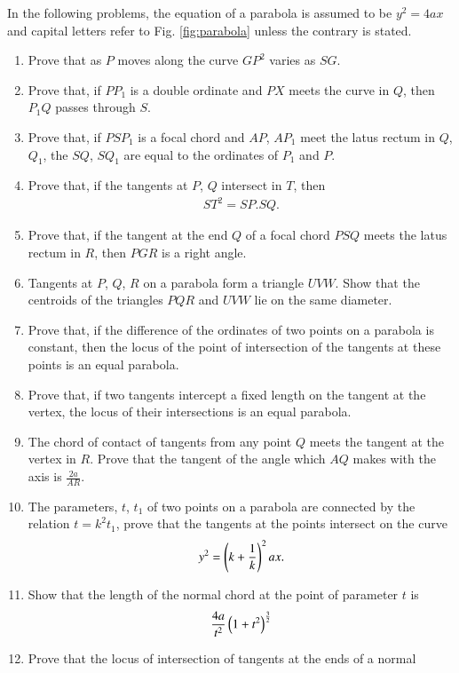 In the following problems, the equation of a parabola is assumed to be $y^2=4ax$ 
and capital letters refer to Fig. \ref{fig:parabola} unless the contrary is stated.
\begin{enumerate}[1.]
\item Prove that as $P$ moves along the curve $GP^2$ varies as $SG$.
\item Prove that, if $PP_1$ is a double ordinate and $PX$ meets the curve in $Q$,
then $P_1Q$ passes through $S$.
\item Prove that, if $PSP_1$ is a focal chord and $AP$, $AP_1$ meet the latus rectum in $Q$, $Q_1$,
the $SQ$, $SQ_1$ are equal to the ordinates of $P_1$ and $P$.
\item Prove that, if the tangents at $P$, $Q$ intersect in $T$, then
\begin{align*}
ST^2=SP.SQ.
\end{align*}
\item Prove that, if the tangent at the end $Q$ of a focal chord $PSQ$ meets the latus rectum
in $R$, then $PGR$ is a right angle.
\item Tangents at $P$, $Q$, $R$ on a parabola form a triangle $UVW$.  Show that the centroids of
the triangles $PQR$ and $UVW$ lie on the same diameter.
\item Prove that, if the difference of the ordinates of two points on a
parabola is constant, then the locus of the point of intersection of the tangents at
these points is an equal parabola.
\item Prove that, if two tangents intercept a fixed length on the tangent at the vertex, the locus
of their intersections is an equal parabola.
\item The chord of contact of tangents from any point $Q$ meets the tangent
at the vertex in $R$.  Prove that the tangent of the angle which $AQ$ makes with the axis
is $\frac{2a}{AR}$.
\item The parameters, $t$, $t_1$ of two points on a parabola are
connected by the relation $t=k^2t_1$, prove that the tangents at the points intersect on the
curve
\begin{align*}
y^2=\left(k+\frac{1}{k}\right)^2ax.
\end{align*}
\item Show that the length of the normal chord at the point of parameter $t$ is
\begin{align*}
\frac{4a}{t^2}\left(1+t^2\right)^{\frac{3}{2}}
\end{align*}
\item Prove that the locus of intersection of tangents at the ends of a normal

\end{enumerate}
